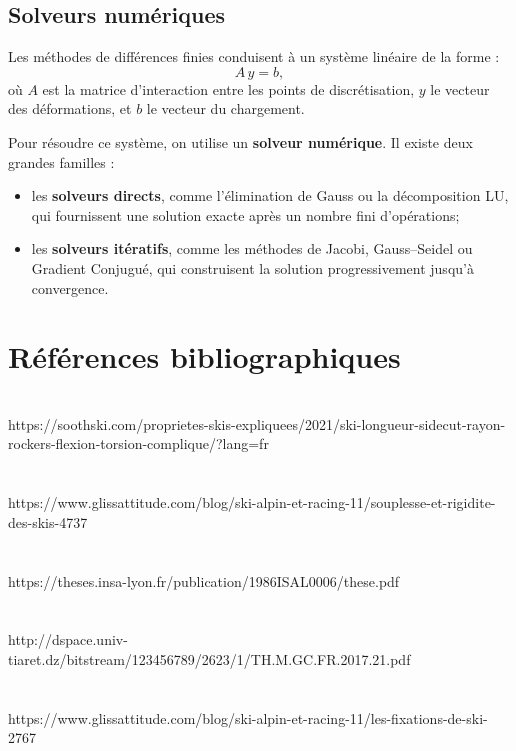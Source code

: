 \documentclass[12pt, a4paper]{article}
\begin{document}
\subsection{Solveurs numériques}

Les méthodes de différences finies conduisent à un système linéaire de la forme :
\[
A \, y = b,
\]
où $A$ est la matrice d'interaction entre les points de discrétisation, $y$ le vecteur des déformations, et $b$ le vecteur du chargement.

Pour résoudre ce système, on utilise un \textbf{solveur numérique}. Il existe deux grandes familles :
\begin{itemize}
\item les \textbf{solveurs directs}, comme l’élimination de Gauss ou la décomposition LU, qui fournissent une solution exacte après un nombre fini d’opérations;
  \item les \textbf{solveurs itératifs}, comme les méthodes de Jacobi, Gauss–Seidel ou Gradient Conjugué, qui construisent la solution progressivement jusqu’à convergence.
\end{itemize}

\section{\textbf{Références bibliographiques}}
\noindent
\\
https://soothski.com/proprietes-skis-expliquees/2021/ski-longueur-sidecut-rayon-rockers-flexion-torsion-complique/?lang=fr \\\\\\
https://www.glissattitude.com/blog/ski-alpin-et-racing-11/souplesse-et-rigidite-des-skis-4737 \\\\\\
https://theses.insa-lyon.fr/publication/1986ISAL0006/these.pdf\\\\\\
http://dspace.univ-tiaret.dz/bitstream/123456789/2623/1/TH.M.GC.FR.2017.21.pdf \\\\\\
https://www.glissattitude.com/blog/ski-alpin-et-racing-11/les-fixations-de-ski-2767 \\\\\\
\end{document}

